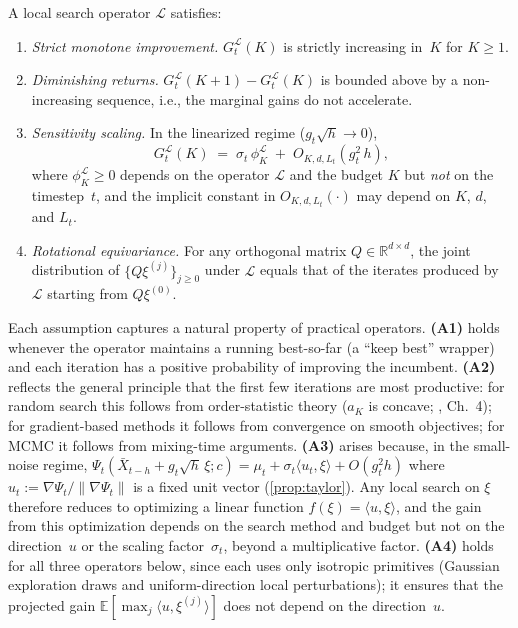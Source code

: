 \begin{assumption}
\label{asm:local-search}
A local search operator $\mathcal{L}$ satisfies:
\begin{enumerate}
\item[\textbf{(A1)}]
  \emph{Strict monotone improvement.}\;
  $G_t^{\mathcal{L}}(K)$ is strictly increasing in~$K$ for $K\ge 1$.
\item[\textbf{(A2)}]
  \emph{Diminishing returns.}\;
  $G_t^{\mathcal{L}}(K{+}1)-G_t^{\mathcal{L}}(K)$ is bounded above
  by a non-increasing sequence, i.e., the marginal gains do not
  accelerate.
\item[\textbf{(A3)}]
  \emph{Sensitivity scaling.}\;
  In the linearized regime ($g_t\sqrt{h}\to 0$),
  \begin{equation}
    G_t^{\mathcal{L}}(K)
    \;=\; \sigma_t\,\phi_K^{\mathcal{L}}
    \;+\; O_{K,d,L_t}(g_t^2\,h),
    \label{eq:sensitivity-scaling}
  \end{equation}
  where $\phi_K^{\mathcal{L}}\ge 0$ depends on the operator
  $\mathcal{L}$ and the budget $K$ but \emph{not} on the
  timestep~$t$, and the implicit constant in $O_{K,d,L_t}(\cdot)$ may
  depend on $K$, $d$, and $L_t$.
\item[\textbf{(A4)}]
  \emph{Rotational equivariance.}\;
  For any orthogonal matrix $Q\in\mathbb{R}^{d\times d}$, the joint
  distribution of $\{Q\xi^{(j)}\}_{j\ge 0}$ under $\mathcal{L}$
  equals that of the iterates produced by $\mathcal{L}$ starting
  from $Q\xi^{(0)}$.
\end{enumerate}
\end{assumption}

\begin{remark}
\label{rmk:grounding}
Each assumption captures a natural property of practical operators.
\textbf{(A1)} holds whenever the operator
maintains a running best-so-far (a ``keep best'' wrapper) and each
iteration has a positive probability of improving the incumbent.
\textbf{(A2)} reflects the general principle that the first
few iterations are most productive: for random search this follows from
order-statistic theory ($a_K$ is concave;
\citealt{david2003order}, Ch.~4); for gradient-based methods it
follows from convergence on smooth objectives; for MCMC it follows from
mixing-time arguments.
\textbf{(A3)} arises because, in the small-noise regime,
$\Psi_t(\bar{X}_{t-h}+g_t\sqrt{h}\,\xi;c)
= \mu_t+\sigma_t\langle u_t,\xi\rangle + O(g_t^2 h)$
where $u_t:=\nabla\Psi_t/\|\nabla\Psi_t\|$ is a fixed unit vector
(\cref{prop:taylor}).
Any local search on $\xi$ therefore reduces to optimizing a linear
function $f(\xi)=\langle u,\xi\rangle$, and the gain from this
optimization depends on the search method and budget but not on the
direction~$u$ or the scaling factor~$\sigma_t$, beyond a
multiplicative factor.
\textbf{(A4)} holds for all three operators below, since each uses
only isotropic primitives (Gaussian exploration draws and
uniform-direction local perturbations); it ensures that the
projected gain $\mathbb{E}[\max_j\langle u,\xi^{(j)}\rangle]$ does
not depend on the direction~$u$.
\end{remark}


